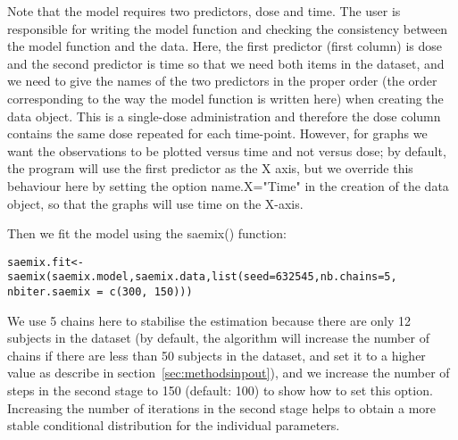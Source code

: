 Note that the model requires two predictors, dose and time. The user is responsible for writing the model function and checking the consistency between the model function and the data. Here, the first predictor (first column) is dose and the second predictor is time so that we need both items in the dataset, and we need to give the names of the two predictors in the proper order (the order corresponding to the way the model function is written here) when creating the data object. This is a single-dose administration and therefore the dose column contains the same dose repeated for each time-point. However, for graphs we want the observations to be plotted versus time and not versus dose; by default, the program will use the first predictor as the X axis, but we override this behaviour here by setting the option {\sf name.X="Time"} in the creation of the data object, so that the graphs will use time on the X-axis.

Then we fit the model using the {\sf saemix()} function:
\begin{verbatim}
saemix.fit<-saemix(saemix.model,saemix.data,list(seed=632545,nb.chains=5,
nbiter.saemix = c(300, 150)))
\end{verbatim}
We use 5 chains here to stabilise the estimation because there are only 12 subjects in the dataset (by default, the algorithm will increase the number of chains if there are less than 50 subjects in the dataset, and set it to a higher value as describe in section~\ref{sec:methodsinpout}), and we increase the number of steps in the second stage to 150 (default: 100) to show how to set this option. Increasing the number of iterations in the second stage helps to obtain a more stable conditional distribution for the individual parameters.

